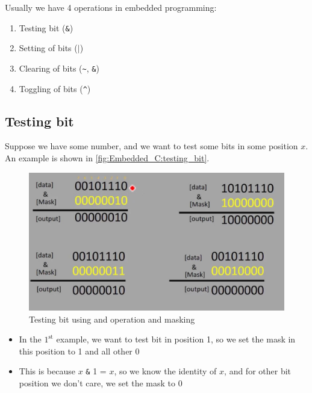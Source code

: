Usually we have 4 operations in embedded programming:

\begin{enumerate}
    \item Testing bit (\verb|&|)
    
    \item Setting of bits ($|$)
    
    \item Clearing of bits (\verb|~|, \verb|&|)
    
    \item Toggling of bits (\verb|^|)
    
\end{enumerate}



\newpage
\subsection{Testing bit}

Suppose we have some number, and we want to test some bits in some position $x$. An example is shown in \autoref{fig:Embedded_C:testing_bit}.

\begin{figure}[h]
\centering
\includegraphics[scale=0.5]{Figures/Embedded_C/testing_bit}
\caption{Testing bit using and operation and masking}
\label{fig:Embedded_C:testing_bit}
\end{figure} 

\begin{itemize}
    \item In the $\mathrm{1}^\mathrm{st}$ example, we want to test bit in position 1, so we set the mask in this position to 1 and all other 0
    
    \item This is because $x$ \verb|&| 1 = $x$, so we know the identity of $x$, and for other bit position we don't care, we set the mask to 0
\end{itemize}


